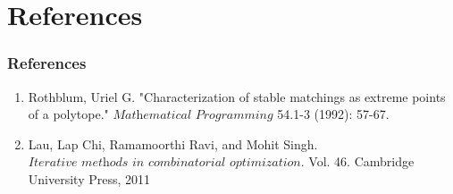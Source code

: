 \documentclass{beamer}
\begin{document}
\section{References}
\begin{frame}
\frametitle{References}
\begin{enumerate}
\item Rothblum, Uriel G. "Characterization of stable matchings as extreme points of a polytope." $\textit{Mathematical Programming}$ 54.1-3 (1992): 57-67.
\item Lau, Lap Chi, Ramamoorthi Ravi, and Mohit Singh. $\textit{Iterative methods in combinatorial optimization}$. Vol. 46. Cambridge University Press, 2011
\end{enumerate}
\end{frame}
\end{document}
